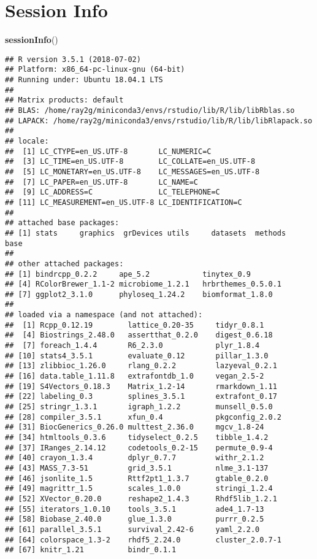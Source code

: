 \documentclass[]{article}
\newenvironment{Shaded}{\begin{snugshade}}{\end{snugshade}}
\newcommand{\KeywordTok}[1]{\textcolor[rgb]{0.13,0.29,0.53}{\textbf{#1}}}
\newcommand{\NormalTok}[1]{#1}
\begin{document}
\hypertarget{session-info}{%
\section{Session Info}\label{session-info}}

\begin{Shaded}
\begin{Highlighting}[]
\KeywordTok{sessionInfo}\NormalTok{()}
\end{Highlighting}
\end{Shaded}

\begin{verbatim}
## R version 3.5.1 (2018-07-02)
## Platform: x86_64-pc-linux-gnu (64-bit)
## Running under: Ubuntu 18.04.1 LTS
## 
## Matrix products: default
## BLAS: /home/ray2g/miniconda3/envs/rstudio/lib/R/lib/libRblas.so
## LAPACK: /home/ray2g/miniconda3/envs/rstudio/lib/R/lib/libRlapack.so
## 
## locale:
##  [1] LC_CTYPE=en_US.UTF-8       LC_NUMERIC=C              
##  [3] LC_TIME=en_US.UTF-8        LC_COLLATE=en_US.UTF-8    
##  [5] LC_MONETARY=en_US.UTF-8    LC_MESSAGES=en_US.UTF-8   
##  [7] LC_PAPER=en_US.UTF-8       LC_NAME=C                 
##  [9] LC_ADDRESS=C               LC_TELEPHONE=C            
## [11] LC_MEASUREMENT=en_US.UTF-8 LC_IDENTIFICATION=C       
## 
## attached base packages:
## [1] stats     graphics  grDevices utils     datasets  methods   base     
## 
## other attached packages:
## [1] bindrcpp_0.2.2     ape_5.2            tinytex_0.9       
## [4] RColorBrewer_1.1-2 microbiome_1.2.1   hrbrthemes_0.5.0.1
## [7] ggplot2_3.1.0      phyloseq_1.24.2    biomformat_1.8.0  
## 
## loaded via a namespace (and not attached):
##  [1] Rcpp_0.12.19        lattice_0.20-35     tidyr_0.8.1        
##  [4] Biostrings_2.48.0   assertthat_0.2.0    digest_0.6.18      
##  [7] foreach_1.4.4       R6_2.3.0            plyr_1.8.4         
## [10] stats4_3.5.1        evaluate_0.12       pillar_1.3.0       
## [13] zlibbioc_1.26.0     rlang_0.2.2         lazyeval_0.2.1     
## [16] data.table_1.11.8   extrafontdb_1.0     vegan_2.5-2        
## [19] S4Vectors_0.18.3    Matrix_1.2-14       rmarkdown_1.11     
## [22] labeling_0.3        splines_3.5.1       extrafont_0.17     
## [25] stringr_1.3.1       igraph_1.2.2        munsell_0.5.0      
## [28] compiler_3.5.1      xfun_0.4            pkgconfig_2.0.2    
## [31] BiocGenerics_0.26.0 multtest_2.36.0     mgcv_1.8-24        
## [34] htmltools_0.3.6     tidyselect_0.2.5    tibble_1.4.2       
## [37] IRanges_2.14.12     codetools_0.2-15    permute_0.9-4      
## [40] crayon_1.3.4        dplyr_0.7.7         withr_2.1.2        
## [43] MASS_7.3-51         grid_3.5.1          nlme_3.1-137       
## [46] jsonlite_1.5        Rttf2pt1_1.3.7      gtable_0.2.0       
## [49] magrittr_1.5        scales_1.0.0        stringi_1.2.4      
## [52] XVector_0.20.0      reshape2_1.4.3      Rhdf5lib_1.2.1     
## [55] iterators_1.0.10    tools_3.5.1         ade4_1.7-13        
## [58] Biobase_2.40.0      glue_1.3.0          purrr_0.2.5        
## [61] parallel_3.5.1      survival_2.42-6     yaml_2.2.0         
## [64] colorspace_1.3-2    rhdf5_2.24.0        cluster_2.0.7-1    
## [67] knitr_1.21          bindr_0.1.1
\end{verbatim}
\end{document}
